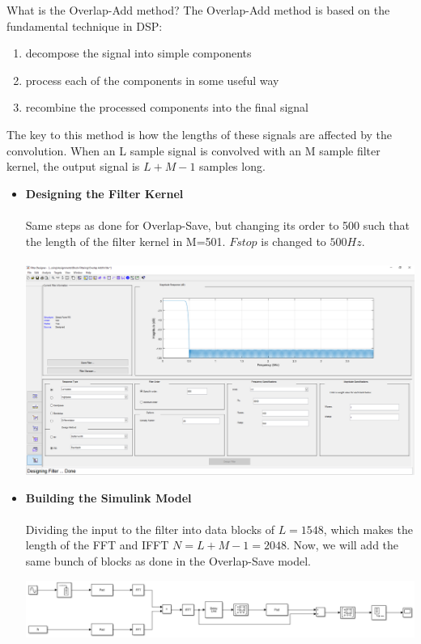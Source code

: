\documentclass[12pt,a4paper]{article}
\begin{document}
{What is the Overlap-Add method? The Overlap-Add method is based on the fundamental technique in DSP: 
\begin{enumerate}
    \item  decompose the signal into simple components
    \item process each of the components in some useful way
    \item recombine the processed components into the final signal
\end{enumerate}
 The key to this method is how the lengths of these signals are affected by the convolution. When an L sample signal is convolved with an M sample filter kernel, the output signal is $L+M-1$ samples long.\\}
\begin{itemize}
\item \textbf {Designing the Filter Kernel}{\\}{\\}
{Same steps as done for Overlap-Save, but changing its order to 500 such that the length of the filter kernel in M=501. $Fstop$ is changed to $500Hz$.\\ \\}
\includegraphics[width=\textwidth]{Photos/overlap add filter.png}
\newpage
\item \textbf {Building the Simulink Model}{\\}{\\}
{Dividing the input to the filter into data blocks of $L=1548$, which makes the length of the FFT and IFFT $N=L+M-1=2048$. Now, we will add the same bunch of blocks as done in the Overlap-Save model.}

\includegraphics[width=\textwidth]{Photos/overlap add BD.png}


\end{itemize}
\end{document}
